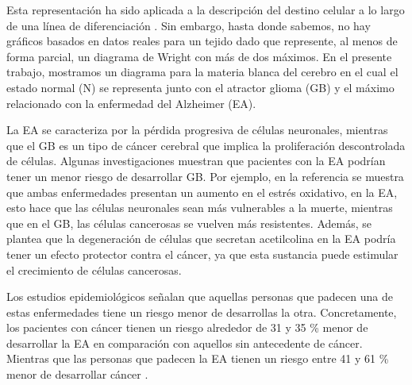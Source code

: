 Esta representación ha sido aplicada a la descripción del destino celular a lo largo de una línea de diferenciación \cite{casey2020theory}. Sin embargo, hasta donde sabemos, no hay gráficos basados en datos reales para un tejido dado que represente, al menos de forma parcial, un diagrama de Wright con más de dos máximos. En el presente trabajo, mostramos un diagrama para la materia blanca del cerebro en el cual el estado normal (N) se representa junto con el atractor glioma (GB) y el máximo relacionado con la enfermedad del Alzheimer (EA).

La EA se caracteriza por la pérdida progresiva de células neuronales, mientras que el GB es un tipo de cáncer cerebral que implica la proliferación descontrolada de células. Algunas investigaciones muestran que pacientes con la EA podrían tener un menor riesgo de desarrollar GB. Por ejemplo, en la referencia \cite{ou2012does} se muestra que ambas enfermedades presentan un aumento en el estrés oxidativo, en la EA, esto hace que las células neuronales sean más vulnerables a la muerte, mientras que en el GB, las células cancerosas se vuelven más resistentes. Además, se plantea que la degeneración de células que secretan acetilcolina en la EA podría tener un efecto protector contra el cáncer, ya que esta sustancia puede estimular el crecimiento de células cancerosas.


Los estudios epidemiológicos señalan que aquellas personas que padecen una de estas enfermedades tiene un riesgo menor de desarrollas la otra. Concretamente, los pacientes con cáncer tienen un riesgo alrededor de 31 y 35 \% menor de desarrollar la EA en comparación con aquellos sin antecedente de cáncer. Mientras que las personas que padecen la EA tienen un riesgo entre 41 y 61 \% menor de desarrollar cáncer \cite{Roe_2010, Driver_2012, Musicco_2013}.

